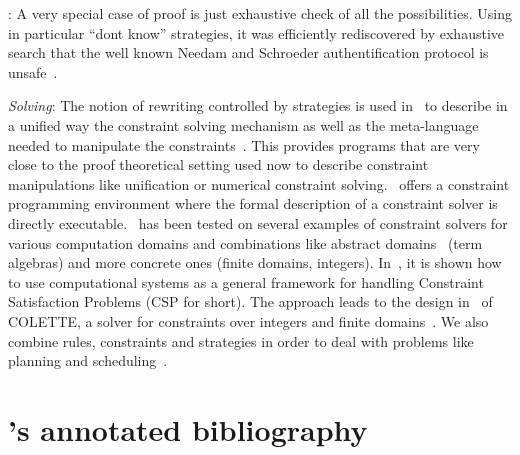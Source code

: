 : A very special case of proof is just exhaustive
check of all the possibilities. Using in particular ``dont know'' strategies, it
was efficiently rediscovered by exhaustive search that the well known Needam and
Schroeder authentification protocol is unsafe~\cite{Cirstea-Proto-99}.

\noindent
{\it Solving}:
The notion of rewriting controlled by strategies is used 
in~\cite{Castro-FI98,KirchnerR-FI98} to describe in a unified way the
constraint solving 
mechanism as well as the meta-language needed to manipulate the
constraints~\cite{castro-esslli-1997,castrokirchner:rta-war:1998}. This provides programs that are
very close to the proof theoretical setting used now to describe
constraint manipulations like unification or numerical constraint
solving. \elan\ offers a constraint programming environment where
the formal description of a constraint solver is directly
executable. 
\elan\ has been tested 
on several examples of constraint solvers for various computation domains and
combinations like abstract
domains~\cite{KirchnerR-FI98,Ringeissen-RTA97} (term  
algebras) and more concrete ones (finite domains, integers).
In~\cite{Castro-ICTAI96,Castro-RwLg1996,Castro-ESSLLI97,castro:phd:1998},  
it is shown how to use computational systems as a general framework
for handling Constraint Satisfaction Problems (CSP for short). The
approach leads to the design in \elan\ of \textsf{COLETTE}, a solver
for constraints over integers and finite domains~\cite{castro:aisc:1998}. 
We also combine rules, constraints and strategies in order to deal with problems like
planning and scheduling~\cite{DuboisKirchner-Ercim99}.


\section{\elan's annotated bibliography}


